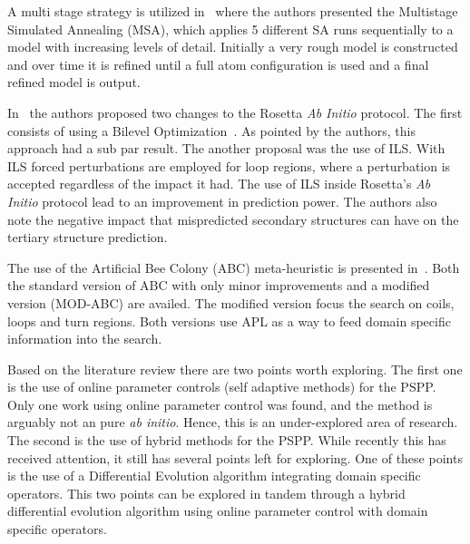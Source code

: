 A multi stage strategy is utilized in~\cite{silva2018multistage} where the authors
presented the Multistage Simulated Annealing (MSA), which applies 5 different
SA runs sequentially to a model with increasing levels of detail. Initially a
very rough model is constructed and over time it is refined until a full atom
configuration is used and a final refined model is output.

In~\cite{kandathil2018improved} the authors proposed two changes to the Rosetta
\textit{Ab Initio} protocol. The first consists of using a Bilevel
Optimization~\cite{sinha2018review}. As pointed by the authors, this approach had
a sub par result. The another proposal was the use of \ac{ILS}. With ILS forced
perturbations are employed for loop regions, where a perturbation is accepted 
regardless of the impact it had. The use of \ac{ILS} inside Rosetta's
\textit{Ab Initio} protocol lead to an improvement in prediction power.
The authors also note the negative impact that mispredicted secondary structures
can have on the tertiary structure prediction.


The use of the Artificial Bee Colony (ABC) meta-heuristic is presented
in~\cite{correa2018knowledge}. Both the standard version of ABC with only
minor improvements and a modified version (MOD-ABC) are availed.
The modified version focus the search on coils, loops and turn regions. Both versions
use \ac{APL} as a way to feed domain specific information into the search.



Based on the literature review there are two points worth exploring. The first one
is the use of online parameter controls (self adaptive methods) for the PSPP.
Only one work using online parameter control was found, and the method is arguably
not an pure \textit{ab initio}. Hence, this is an under-explored area of research.
The second is the use of hybrid methods for the PSPP. While recently this has received
attention, it still has several points left for exploring. One of these points is the
use of a Differential Evolution algorithm integrating domain specific operators.
This two points can be explored in tandem through a hybrid differential evolution
algorithm using online parameter control with domain specific operators.


